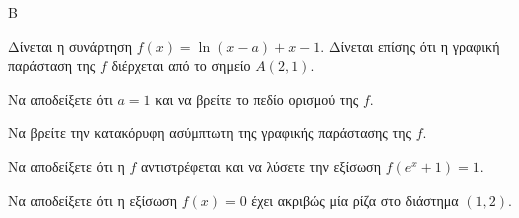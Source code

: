 \begin{thema}{Β}

Δίνεται η συνάρτηση $f(x) = \ln(x - a) + x - 1$. Δίνεται επίσης ότι η γραφική παράσταση της $f$ διέρχεται από το σημείο $A(2, 1)$.
\begin{erwthma}
\item Να αποδείξετε ότι $a = 1$ και να βρείτε το πεδίο ορισμού της $f$.
\item Να βρείτε την κατακόρυφη ασύμπτωτη της γραφικής παράστασης της $f$.
\item Να αποδείξετε ότι η $f$ αντιστρέφεται και να λύσετε την εξίσωση $f(e^x + 1) = 1$.
\item Να αποδείξετε ότι η εξίσωση $f(x) = 0$ έχει ακριβώς μία ρίζα στο διάστημα $(1, 2)$.
\end{erwthma}
\end{thema}
